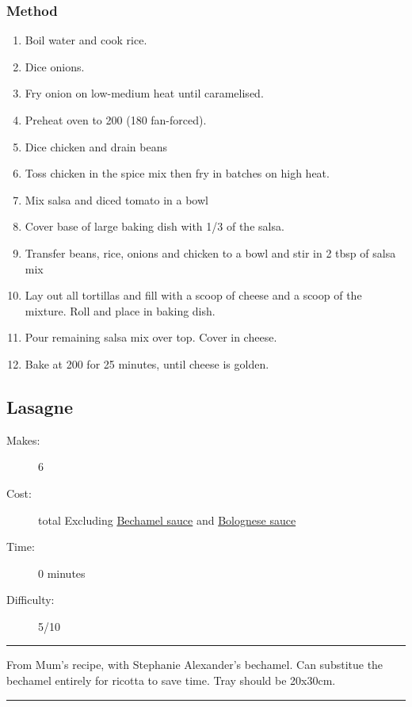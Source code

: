 \documentclass[]{article}
\begin{document}
\subsubsection*{\Large Method}
\begin{enumerate}[font=\huge\color{accent}]
	\item Boil water and cook rice.
	\item Dice onions.
	\item Fry onion on low-medium heat until caramelised.
	\item Preheat oven to 200 (180 fan-forced).
	\item Dice chicken and drain beans
	\item Toss chicken in the spice mix then fry in batches on high heat.
	\item Mix salsa and diced tomato in a bowl
	\item Cover base of large baking dish with 1/3 of the salsa.
	\item Transfer beans, rice, onions and chicken to a bowl and stir in 2 tbsp of salsa mix
	\item Lay out all tortillas and fill with a scoop of cheese and a scoop of the mixture. Roll and place in baking dish.
	\item Pour remaining salsa mix over top. Cover in cheese.
	\item Bake at 200 for 25 minutes, until cheese is golden.
\end{enumerate}
\newpage
{}\label{rec:Lasagne}
\subsection*{\center\huge Lasagne}
\begin{description}
\item[Makes:] 6 
\item[Cost:]  total Excluding \hyperref[rec:Bechamel]{Bechamel sauce} and \hyperref[rec:Bolognese]{Bolognese sauce}
\item[Time:] 0 minutes
\item[Difficulty:] 5/10
\end{description}
\vspace{0.2cm}\hrule\vspace{0.5cm}
\begin{adjustwidth}{0.5 cm}{0.5 cm}

From Mum's recipe, with Stephanie Alexander's bechamel. Can substitue the bechamel entirely for ricotta to save time. Tray should be 20x30cm. \hfill{}\color{black}

\end{adjustwidth}
\vspace{0.5cm}\hrule
\end{document}
